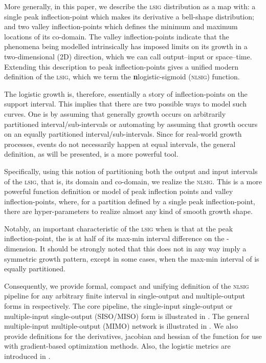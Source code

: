 \documentclass[journal]{IEEEtran}
\theoremstyle{plain}
\theoremstyle{definition}
\theoremstyle{remark}
\begin{document}
More generally, in this paper, we describe the \textsc{lsig} distribution as a map with: a single peak inflection-point which makes its derivative a bell-shape distribution; and two valley inflection-points which defines the minimum and maximum locations of its co-domain. The valley inflection-points indicate that the phenomena being modelled intrinsically has imposed limits
on its growth in a two-dimensional (2D) direction, which we can call output--input or space--time. Extending this description to  peak inflection-points gives a unified modern definition of the \textsc{lsig}, which we term the \textbf{n}logistic-sigmoid (\textsc{nlsig}) function.

The logistic growth is, therefore, essentially a story of inflection-points on the  support interval. This implies that there are two possible ways to model such curves. One is by assuming that generally growth occurs on arbitrarily partitioned interval/sub-intervals or automating by assuming that growth occurs on an equally partitioned interval/sub-intervals. Since for real-world growth processes, events do not necessarily happen at equal intervals, the general definition, as will be presented, is a more powerful tool.

Specifically, using this notion of partitioning both the output and input intervals of the \textsc{lsig}, that is, its domain and co-domain, we realize the \textsc{nlsig}. This is a more powerful function definition or model of  peak inflection points and  valley inflection-points, where, for a partition defined by a single peak inflection-point, there are  hyper-parameters to realize almost any kind of smooth growth shape.

Notably, an important characteristic of the \textsc{lsig} when  is that at the peak inflection-point, the  is at half of its max-min interval difference on the -dimension. It should be strongly noted that this does not in any way imply a symmetric growth pattern, except in some cases, when the max-min interval of  is equally partitioned.

Consequently, we provide formal, compact and unifying definition of the \textsc{nlsig} pipeline for any arbitrary finite interval in single-output and multiple-output forms in  respectively. The core pipeline, the single-input single-output or multiple-input single-output (SISO/MISO) form is illustrated in . The general multiple-input multiple-output (MIMO) network is illustrated in . We also provide definitions for the derivatives, jacobian and hessian of the function for use with gradient-based optimization methods. Also, the logistic metrics are introduced in .
\end{document}
